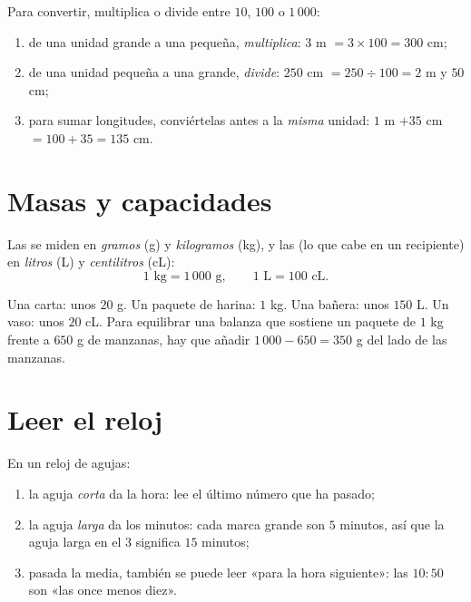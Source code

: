 \begin{method}\label{met:g3:measure:convert}
Para convertir, multiplica o divide entre $10$, $100$ o $1\,000$:
\begin{enumerate}
  \item de una unidad grande a una pequeña, \emph{multiplica}:
        $3$ m $= 3 \times 100 = 300$ cm;
  \item de una unidad pequeña a una grande, \emph{divide}:
        $250$ cm $= 250 \div 100 = 2$ m y $50$ cm;
  \item para sumar longitudes, conviértelas antes a la \emph{misma} unidad:
        $1$ m $+ 35$ cm $= 100 + 35 = 135$ cm.
\end{enumerate}
\end{method}

\section{Masas y capacidades}

\begin{definition}\label{def:g3:measure:mass}
Las  se miden en \emph{gramos} (g) y \emph{kilogramos} (kg), y las
 (lo que cabe en un recipiente) en \emph{litros} (L) y
\emph{centilitros} (cL):
\[
1 \text{ kg} = 1\,000 \text{ g},
\qquad
1 \text{ L} = 100 \text{ cL}.
\]
\end{definition}

\begin{example}\label{ex:g3:measure:mass}
Una carta: unos $20$ g. Un paquete de harina: $1$ kg. Una bañera: unos
$150$ L. Un vaso: unos $20$ cL. Para equilibrar una balanza que sostiene un
paquete de $1$ kg frente a $650$ g de manzanas, hay que añadir $1\,000 - 650 = 350$ g
del lado de las manzanas.
\end{example}

\section{Leer el reloj}

\begin{method}\label{met:g3:measure:clock}
En un reloj de agujas:
\begin{enumerate}
  \item la aguja \emph{corta} da la hora: lee el último número que ha
        pasado;
  \item la aguja \emph{larga} da los minutos: cada marca grande son $5$
        minutos, así que la aguja larga en el $3$ significa $15$ minutos;
  \item pasada la media, también se puede leer «para la hora siguiente»:
        las $10{:}50$ son «las once menos diez».
\end{enumerate}
\end{method}

